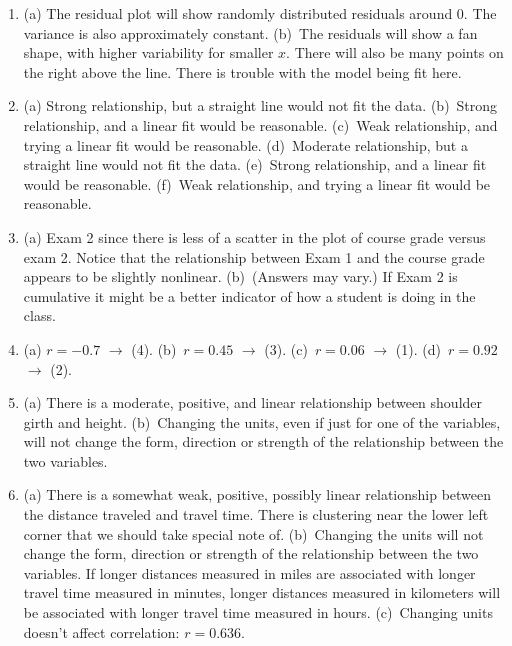 \documentclass[
  10pt,
  openany]{book}
\providecommand{\tightlist}{%
  \setlength{\itemsep}{0pt}\setlength{\parskip}{0pt}}
\begin{document}
\begin{enumerate}
\def\labelenumi{\arabic{enumi}.}
\tightlist
\item
  (a) The residual plot will show randomly distributed residuals around 0. The variance is also approximately constant. (b)~The residuals will show a fan shape, with higher variability for smaller \(x\). There will also be many points on the right above the line. There is trouble with the model being fit here.

  \addtocounter{enumi}{1}
\item
  (a) Strong relationship, but a straight line would not fit the data. (b)~Strong relationship, and a linear fit would be reasonable. (c)~Weak relationship, and trying a linear fit would be reasonable. (d)~Moderate relationship, but a straight line would not fit the data. (e)~Strong relationship, and a linear fit would be reasonable. (f)~Weak relationship, and trying a linear fit would be reasonable.

  \addtocounter{enumi}{1}
\item
  (a) Exam 2 since there is less of a scatter in the plot of course grade versus exam 2. Notice that the relationship between Exam 1 and the course grade appears to be slightly nonlinear. (b)~(Answers may vary.) If Exam 2 is cumulative it might be a better indicator of how a student is doing in the class.

  \addtocounter{enumi}{1}
\item
  (a) \(r = -0.7\) \(\rightarrow\) (4). (b)~\(r = 0.45\) \(\rightarrow\) (3). (c)~\(r = 0.06\) \(\rightarrow\) (1). (d)~\(r = 0.92\) \(\rightarrow\) (2).

  \addtocounter{enumi}{1}
\item
  (a) There is a moderate, positive, and linear relationship between shoulder girth and height. (b)~Changing the units, even if just for one of the variables, will not change the form, direction or strength of the relationship between the two variables.

  \addtocounter{enumi}{1}
\item
  (a) There is a somewhat weak, positive, possibly linear relationship between the distance traveled and travel time. There is clustering near the lower left corner that we should take special note of. (b)~Changing the units will not change the form, direction or strength of the relationship between the two variables. If longer distances measured in miles are associated with longer travel time measured in minutes, longer distances measured in kilometers will be associated with longer travel time measured in hours. (c)~Changing units doesn't affect correlation: \(r = 0.636\).


\end{enumerate}
\end{document}
